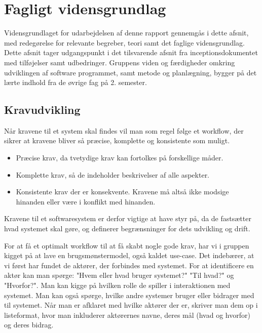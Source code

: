 \clearpage
\section{Fagligt vidensgrundlag}

Vidensgrundlaget for udarbejdelsen af denne rapport gennemgås i dette afsnit, med redegørelse for relevante begreber, teori samt det faglige vidensgrundlag. Dette afsnit tager udgangspunkt i det tilsvarende afsnit fra inceptionsdokumentet med tilføjelser samt udbedringer. 
Gruppens viden og færdigheder omkring udviklingen af software programmet, samt metode og planlægning, bygger på det lærte indhold fra de øvrige fag på 2. semester. 

\subsection{Kravudvikling}

Når kravene til et system skal findes vil man som regel følge et workflow, der sikrer at kravene bliver så præcise, komplette og konsistente som muligt. 
\begin{itemize}
    \item Præcise krav, da tvetydige krav kan fortolkes på forskellige måder. 
    \item Komplette krav, så de indeholder beskrivelser af alle aspekter. 
    \item Konsistente krav der er konsekvente. Kravene må altså ikke modsige hinanden eller være i konflikt med hinanden.
\end{itemize}
Kravene til et softwaresystem er derfor vigtige at have styr på, da de fastsætter hvad systemet skal gøre, og definerer begrænsninger for dets udvikling og drift. 


For at få et optimalt workflow til at få skabt nogle gode krav, har vi i gruppen kigget på at lave en brugsmønstermodel, også kaldet use-case. 
Det indebærer, at vi først har fundet de aktører, der forbindes med systemet. For at identificere en aktør kan man spørge: "Hvem eller hvad bruger systemet?" "Til hvad?" og "Hvorfor?". Man kan kigge på hvilken rolle de spiller i interaktionen med systemet. Man kan også spørge, hvilke andre systemer bruger eller bidrager med til systemet. Når man er afklaret med hvilke aktører der er, skriver man dem op i listeformat, hvor man inkluderer aktørernes navne, deres mål (hvad og hvorfor) og deres bidrag.

